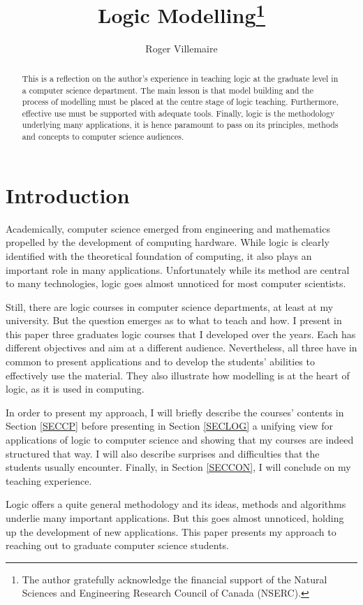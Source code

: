 \documentclass[a4paper,UKenglish]{lipics}
\title{Logic Modelling\footnote{The author gratefully acknowledge the financial support of the Natural Sciences and Engineering Research Council of Canada (NSERC).}}
\author[1]{Roger Villemaire}
\affil[1]{Department of Computer Science\\
  Universit\'e du Qu\'ebec \`a Montr\'eal\\
  C.P.\ 8888, Succ.\ Centre-ville,\\
  Montr\'eal, Qu\'ebec, H3C~3P8, Canada\\
  \nolinkurl{villemaire.roger@uqam.ca}}
\begin{document}
\maketitle



\begin{abstract}
  This is a reflection on the author's experience in teaching logic at the graduate level in a computer science department. The main lesson is that model building and the process of modelling must be placed at the centre stage of logic teaching. Furthermore, effective use must be supported with adequate tools. Finally, logic is the methodology underlying many applications, it is hence paramount to pass on its principles, methods and concepts to computer science audiences.
 \end{abstract}

\section{Introduction}
Academically, computer science emerged from engineering and mathematics propelled by the development of computing hardware. While logic is clearly identified with the theoretical foundation of computing, it also plays an important role in many applications. Unfortunately while its method are central to many technologies, logic goes almost unnoticed for most computer scientists.

Still, there are logic courses in computer science departments, at least at my university. But the question emerges as to what to teach and how. I present in this paper three graduates logic courses that I developed over the years. Each has different objectives and aim at a different audience. Nevertheless, all three have in common to present applications and to develop the students' abilities to effectively use the material. They also illustrate how modelling is at the heart of logic, as it is used in computing.

In order to present my approach, I will briefly describe the courses' contents in Section \ref{SECCP} before presenting in Section \ref{SECLOG} a unifying view for applications of logic to computer science and showing that my courses are indeed structured that way. I will also describe surprises and difficulties that the students usually encounter. Finally, in Section \ref{SECCON}, I will conclude on my teaching experience.

Logic offers a quite general methodology and its ideas, methods and algorithms underlie many important applications. But this goes almost unnoticed, holding up the development of new applications. This paper presents my approach to reaching out to graduate computer science students.
\end{document}
